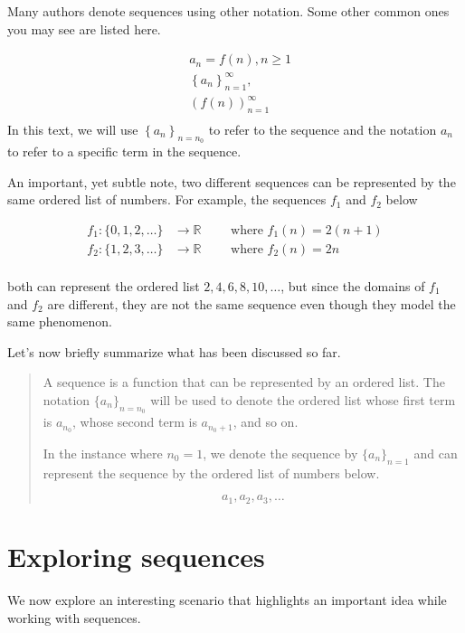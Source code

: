 \documentclass{ximera}
\begin{document}
\begin{remark}
Many authors denote sequences using other notation.  Some other common ones you may see are listed here. 

\begin{align*}
  &a_n = f(n), n \geq 1   \\
  & \left\{a_n\right\}_{n=1}^\infty, \\
  & \left(f(n)\right)_{n=1}^\infty \\
\end{align*}
In this text, we will use $\left\{a_n\right\}_{n=n_0}$ to refer to the sequence and the notation $a_n$ to refer to a specific term in the sequence.

\end{remark}


An important, yet subtle note, two different sequences can be represented by the same ordered list of numbers.  For example, the sequences $f_1$ and $f_2$ below

\[ \begin{array}{rl}
f_1 : \{0,1,2,\ldots \} & \to \mathbb R \qquad \textrm{ where } f_1(n) =2(n+1) \\
f_2 : \{1,2,3, \ldots \} & \to \mathbb R \qquad \textrm{ where } f_2(n) =2n \\
\end{array}
\]

both can represent the ordered list $2, 4, 6, 8, 10, \ldots$, but since the domains of $f_1$ and $f_2$ are different, they are not the same sequence even though they model the same phenomenon. 

Let's now briefly summarize what has been discussed so far.

\begin{quote}
A sequence is a function that can be represented by an ordered list.  The notation $\{a_n\}_{n=n_0}$ will be used to denote the ordered list whose first term is $a_{n_0}$, whose second term is $a_{n_0+1}$, and so on.  

In the instance where $n_0=1$, we denote the sequence by $\{a_n\}_{n=1}$ and can represent the sequence by the ordered list of numbers below.

\[
a_1, a_2, a_3, \ldots
\]
\end{quote}

\section{Exploring sequences}
We now explore an interesting scenario that highlights an important idea while working with sequences.
\end{document}
